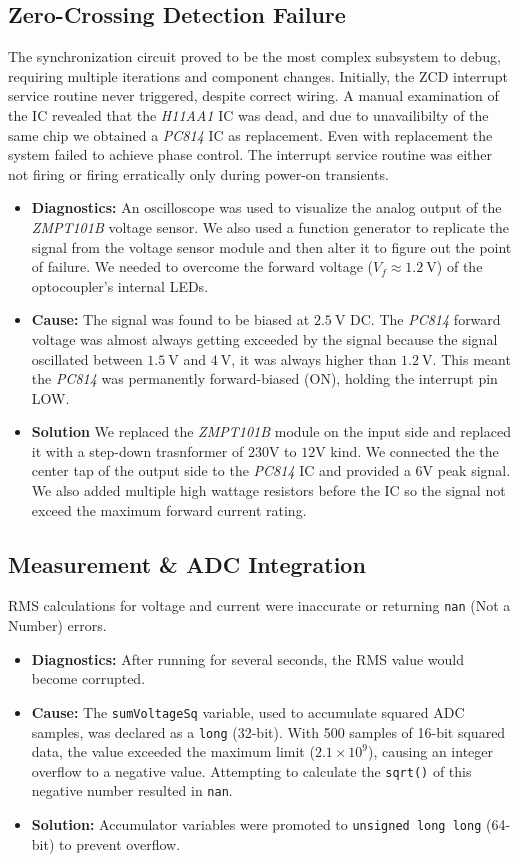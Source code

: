 \documentclass[11pt]{article}
\begin{document}
\subsection{Zero-Crossing Detection Failure}
The synchronization circuit proved to be the most complex subsystem to debug, requiring multiple iterations and component changes. Initially, the ZCD interrupt service routine never triggered, despite correct wiring. A manual examination of the IC revealed that the \emph{H11AA1} IC was dead, and due to unavailibilty of the same chip we obtained a \emph{PC814} IC as replacement. Even with replacement the system failed to achieve phase control. The interrupt service routine was either not firing or firing erratically only during power-on transients.
\begin{itemize}
	\item{\textbf{Diagnostics:}}
		An oscilloscope was used to visualize the analog output of the \emph{ZMPT101B} voltage sensor. We also used a function generator to replicate the signal from the voltage sensor module and then alter it to figure out the point of failure. We needed to overcome the forward voltage ($V_f \approx \SI{1.2}{\volt}$) of the optocoupler's internal LEDs.
	\item{\textbf{Cause:}}
		The signal was found to be biased at $\SI{2.5}{\volt}$ DC. The \emph{PC814} forward voltage was almost always getting exceeded by the signal because the signal oscillated between $\SI{1.5}{\volt}$ and $\SI{4}{\volt}$, it was always higher than $\SI{1.2}{\volt}$. This meant the \emph{PC814} was permanently forward-biased (ON), holding the interrupt pin LOW.
	\item{\textbf{Solution}}
		We replaced the \emph{ZMPT101B} module on the input side and replaced it with a step-down trasnformer of $230\si{\volt}$ to $12\si{\volt}$ kind. We connected the the center tap of the output side to the \emph{PC814} IC and provided a $6\si{\volt}$ peak signal. We also added multiple high wattage resistors before the IC so the signal not exceed the maximum forward current rating.
\end{itemize}
\subsection{Measurement \& ADC Integration}
RMS calculations for voltage and current were inaccurate or returning \verb|nan| (Not a Number) errors.
\begin{itemize}
	\item \textbf{Diagnostics:}
		After running for several seconds, the RMS value would become corrupted.
	\item \textbf{Cause:}
		The \verb|sumVoltageSq| variable, used to accumulate squared ADC samples, was declared as a \verb|long| (32-bit). With 500 samples of 16-bit squared data, the value exceeded the maximum limit ($2.1 \times 10^9$), causing an integer overflow to a negative value. Attempting to calculate the \verb|sqrt()| of this negative number resulted in \verb|nan|.
	\item \textbf{Solution:}
		Accumulator variables were promoted to \verb|unsigned long long| (64-bit) to prevent overflow.
\end{itemize}
\end{document}
